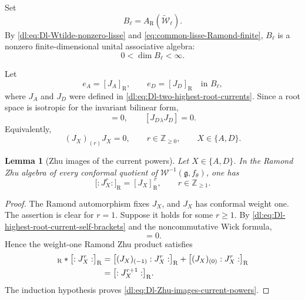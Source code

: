 \documentclass[11pt,reqno]{amsart}
\newtheorem{lemma}[theorem]{Lemma}
\theoremstyle{definition}
\theoremstyle{remark}
\begin{document}
Set
\begin{equation*}
  B_\ell
  =
  A_{\mathrm R}
  \!\left(\widetilde{\mathcal W}_\ell\right).
\end{equation*}
By \eqref{dl:eq:Dl-Wtilde-nonzero-lisse} and
\eqref{eq:common-lisse-Ramond-finite},
\(B_\ell\) is a nonzero finite-dimensional unital associative
algebra:
\begin{equation*}
  0<\dim B_\ell<\infty.
\end{equation*}

Let
\begin{equation*}
  e_A=[J_A]_{\mathrm R},
  \qquad
  e_D=[J_D]_{\mathrm R}
  \quad\text{in }B_\ell,
\end{equation*}
where \(J_A\) and \(J_D\) were defined in
\eqref{dl:eq:Dl-two-highest-root-currents}.  Since a root space is
isotropic for the invariant bilinear form,
\begin{equation}
  [J_A{}_\lambda J_A]=0,
  \qquad
  [J_D{}_\lambda J_D]=0.
  \label{dl:eq:Dl-highest-root-current-self-brackets}
\end{equation}
Equivalently,
\begin{equation*}
  (J_X)_{(r)}J_X=0,
  \qquad
  r\in\mathbb Z_{\ge0},
  \qquad
  X\in\{A,D\}.
\end{equation*}

\begin{lemma}[Zhu images of the current powers]
\label{dl:lem:Dl-Zhu-images-current-powers}
Let \(X\in\{A,D\}\).  In the Ramond Zhu algebra of every conformal
quotient of \(\mathcal W^{-1}(\mathfrak g,f_\theta)\), one has
\begin{equation}
  \bigl[:J_X^r:\bigr]_{\mathrm R}
  =
  [J_X]_{\mathrm R}^{\,r},
  \qquad
  r\in\mathbb Z_{\ge1}.
  \label{dl:eq:Dl-Zhu-images-current-powers}
\end{equation}
\end{lemma}

\begin{proof}
The Ramond automorphism fixes \(J_X\), and \(J_X\) has conformal
weight one.  The assertion is clear for \(r=1\).  Suppose it holds
for some \(r\ge1\).  By
\eqref{dl:eq:Dl-highest-root-current-self-brackets} and the noncommutative
Wick formula,
\begin{equation*}
  [J_X{}_\lambda :J_X^r:]=0.
\end{equation*}
Hence the weight-one Ramond Zhu product satisfies
\begin{align*}
  [J_X]_{\mathrm R}
  *
  \bigl[:J_X^r:\bigr]_{\mathrm R}
  &=
  \bigl[
    (J_X)_{(-1)}:J_X^r:
  \bigr]_{\mathrm R}
  +
  \bigl[
    (J_X)_{(0)}:J_X^r:
  \bigr]_{\mathrm R}
  \notag\\
  &=
  \bigl[:J_X^{r+1}:\bigr]_{\mathrm R}.
\end{align*}
The induction hypothesis proves
\eqref{dl:eq:Dl-Zhu-images-current-powers}.
\end{proof}
\end{document}
